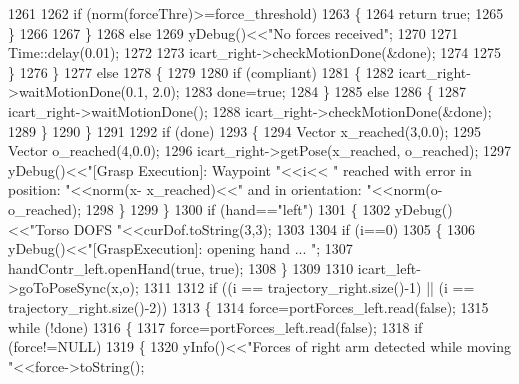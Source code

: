 \begin{DoxyCode}
1261 
1262                     \textcolor{keywordflow}{if} (norm(forceThre)>=force_threshold)
1263                     \{
1264                          \textcolor{keywordflow}{return} \textcolor{keyword}{true};
1265                     \}
1266                     
1267                 \}
1268                 \textcolor{keywordflow}{else}
1269                     yDebug()<<\textcolor{stringliteral}{"No forces received"};
1270 
1271                 Time::delay(0.01);
1272 
1273                 icart\_right->checkMotionDone(&done);
1274                 
1275             \}
1276         \}
1277         \textcolor{keywordflow}{else}
1278         \{
1279 
1280             \textcolor{keywordflow}{if} (compliant)
1281             \{
1282                 icart\_right->waitMotionDone(0.1, 2.0);
1283                 done=\textcolor{keyword}{true};
1284             \}
1285             \textcolor{keywordflow}{else}
1286             \{
1287                 icart\_right->waitMotionDone();
1288                 icart\_right->checkMotionDone(&done);
1289             \}
1290         \}
1291 
1292         \textcolor{keywordflow}{if} (done)
1293         \{
1294              Vector x\_reached(3,0.0);
1295              Vector o\_reached(4,0.0);
1296              icart\_right->getPose(x\_reached, o\_reached);
1297              yDebug()<<\textcolor{stringliteral}{"[Grasp Execution]: Waypoint "}<<i<< \textcolor{stringliteral}{" reached with error in position: "}<<norm(x-
      x\_reached)<<\textcolor{stringliteral}{" and in orientation: "}<<norm(o-o\_reached);
1298         \}
1299     \}
1300     \textcolor{keywordflow}{if} (hand==\textcolor{stringliteral}{"left"})
1301     \{
1302         yDebug()<<\textcolor{stringliteral}{"Torso DOFS "}<<curDof.toString(3,3);
1303 
1304         \textcolor{keywordflow}{if} (i==0)
1305         \{
1306             yDebug()<<\textcolor{stringliteral}{"[GraspExecution]: opening hand ... "};
1307             handContr\_left.openHand(\textcolor{keyword}{true}, \textcolor{keyword}{true});
1308         \}
1309 
1310         icart\_left->goToPoseSync(x,o);
1311 
1312         \textcolor{keywordflow}{if} ((i == trajectory_right.size()-1) || (i == trajectory_right.size()-2))
1313         \{
1314             force=portForces_left.read(\textcolor{keyword}{false});
1315             \textcolor{keywordflow}{while} (!done)
1316             \{
1317                 force=portForces_left.read(\textcolor{keyword}{false});
1318                 \textcolor{keywordflow}{if} (force!=NULL)
1319                 \{ 
1320                     yInfo()<<\textcolor{stringliteral}{"Forces of right arm detected while moving     "}<<force->toString();

\end{DoxyCode}
